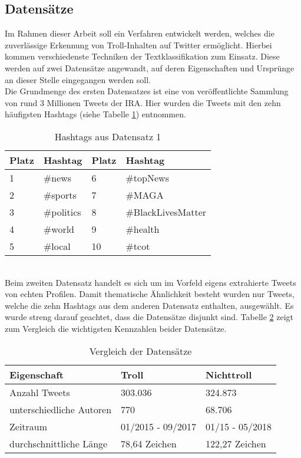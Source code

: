 \subsection{Datensätze}
Im Rahmen dieser Arbeit soll ein Verfahren entwickelt werden, welches die zuverlässige Erkennung von Troll-Inhalten auf Twitter ermöglicht. Hierbei kommen verschiedenste Techniken der Textklassifikation zum Einsatz. Diese werden auf zwei Datensätze angewandt, auf deren Eigenschaften und Ursprünge an dieser Stelle eingegangen werden soll.\\
Die Grundmenge des ersten Datensatzes ist eine von \citet{LinWar18} veröffentlichte Sammlung von rund 3 Millionen Tweets der IRA. Hier wurden die Tweets mit den zehn häufigsten Hashtags (siehe Tabelle \ref{tab_toptweets}) entnommen.\\
\begin{table}[htb]
	\begin{center}
		\begin{tabular}{|l|l||l|l|}
			\hline
			Platz & Hashtag & Platz & Hashtag \\ \hline \hline
			1	& \#news	  & 6	& \#topNews\\ 
			2	& \#sports & 7   & \#MAGA\\
			3   & \#politics & 8 & \#BlackLivesMatter\\
			4   & \#world	& 9 & \#health\\
			5	& \#local	& 10 & \#tcot\\ \hline			
		\end{tabular}
		\caption{Hashtags aus Datensatz 1}\label{tab_toptweets}
	\end{center}
\end{table}\\
Beim zweiten Datensatz handelt es sich um im Vorfeld eigens extrahierte Tweets von echten Profilen. Damit thematische Ähnlichkeit besteht wurden nur Tweets, welche die zehn Hashtags aus dem anderen Datensatz enthalten, ausgewählt. Es wurde streng darauf geachtet, dass die Datensätze disjunkt sind. Tabelle \ref{tab_datasets} zeigt zum Vergleich die wichtigsten Kennzahlen beider Datensätze.
\begin{table}[htb]
	\begin{center}
		\begin{tabular}{|l|l|l|}
			\hline
		Eigenschaft					& Troll		& Nichttroll\\ \hline \hline
		Anzahl Tweets   			& 303.036	& 324.873	\\ \hline
		unterschiedliche Autoren    & 770		& 68.706		\\ \hline
		Zeitraum					& 01/2015 - 09/2017& 01/15 - 05/2018\\ \hline
		durchschnittliche Länge		& 78,64 Zeichen	& 122,27 Zeichen\\ \hline
		\end{tabular}
		\caption{Vergleich der Datensätze}\label{tab_datasets}
	\end{center}
\end{table}
\pagebreak